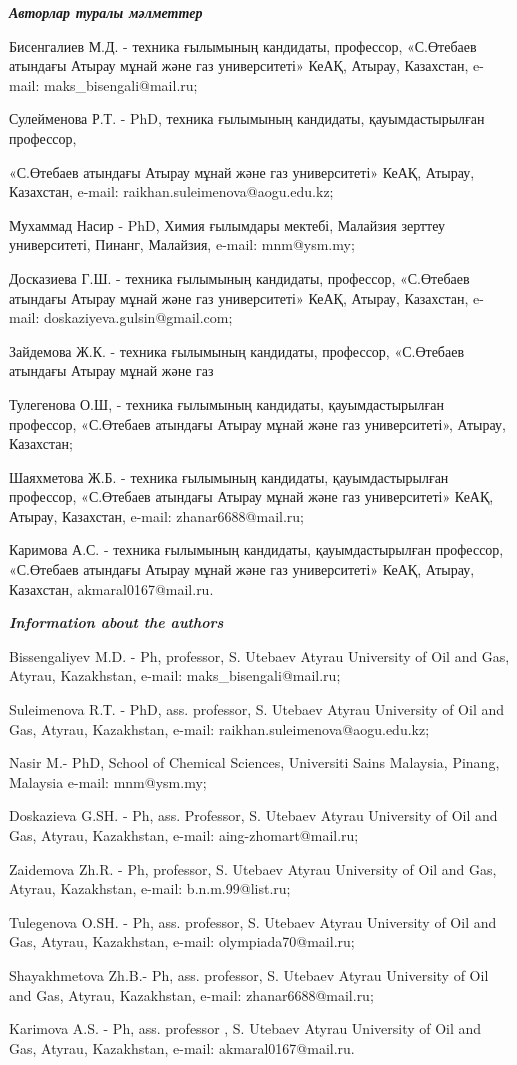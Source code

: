 \begin{info}
\hspace{1em}\emph{{\bfseries Авторлар туралы мәлметтер}}

Бисенгалиев М.Д. - техника ғылымының кандидаты, профессор, «С.Өтебаев
атындағы Атырау мұнай және газ университеті» КеАҚ, Атырау, Казахстан,
e-mail: maks\_bisengali@mail.ru;

Сулейменова Р.Т. - PhD, техника ғылымының кандидаты, қауымдастырылған
профессор,

«С.Өтебаев атындағы Атырау мұнай және газ университеті» КеАҚ, Атырау,
Казахстан, e-mail: raikhan.suleimenova@aogu.edu.kz;

Мухаммад Насир - PhD, Химия ғылымдары мектебі, Малайзия зерттеу
университеті, Пинанг, Малайзия, e-mail: mnm@ysm.my;

Досказиева Г.Ш. - техника ғылымының кандидаты, профессор, «С.Өтебаев
атындағы Атырау мұнай және газ университеті» КеАҚ, Атырау, Казахстан,
e-mail: doskaziyeva.gulsin@gmail.com;

Зайдемова Ж.К. - техника ғылымының кандидаты, профессор, «С.Өтебаев
атындағы Атырау мұнай және газ

Тулегенова О.Ш, - техника ғылымының кандидаты, қауымдастырылған
профессор, «С.Өтебаев атындағы Атырау мұнай және газ университеті»,
Атырау, Казахстан;

Шаяхметова Ж.Б. - техника ғылымының кандидаты, қауымдастырылған
профессор, «С.Өтебаев атындағы Атырау мұнай және газ университеті»
КеАҚ, Атырау, Казахстан, e-mail: zhanar6688@mail.ru;

Каримова А.С. - техника ғылымының кандидаты, қауымдастырылған
профессор, «С.Өтебаев атындағы Атырау мұнай және газ университеті»
КеАҚ, Атырау, Казахстан, akmaral0167@mail.ru.

\hspace{1em}\emph{{\bfseries Information about the authors}}

Bissengaliyev M.D. - Ph, professor, S. Utebaev Atyrau University of
Oil and Gas, Atyrau, Kazakhstan, e-mail: maks\_bisengali@mail.ru;

Suleimenova R.Т. - PhD, ass. professor, S. Utebaev Atyrau University
of Oil and Gas, Atyrau, Kazakhstan, e-mail:
raikhan.suleimenova@aogu.edu.kz;

Nasir M.- PhD, School of Chemical Sciences, Universiti Sains Malaysia,
Pinang, Malaysia e-mail: mnm@ysm.my;

Doskazieva G.SH. - Ph, ass. Professor, S. Utebaev Atyrau University of
Oil and Gas, Atyrau, Kazakhstan, e-mail: aing-zhomart@mail.ru;

Zaidemova Zh.R. - Ph, professor, S. Utebaev Atyrau University of Oil
and Gas, Atyrau, Kazakhstan, e-mail: b.n.m.99@list.ru;

Tulegenova O.SH. - Ph, ass. professor, S. Utebaev Atyrau University of
Oil and Gas, Atyrau, Kazakhstan, e-mail: olympiada70@mail.ru;

Shayakhmetova Zh.B.- Ph, ass. professor, S. Utebaev Atyrau University
of Oil and Gas, Atyrau, Kazakhstan, e-mail: zhanar6688@mail.ru;

Karimova A.S. - Ph, ass. professor , S. Utebaev Atyrau University of
Oil and Gas, Atyrau, Kazakhstan, e-mail: akmaral0167@mail.ru.
\end{info}
